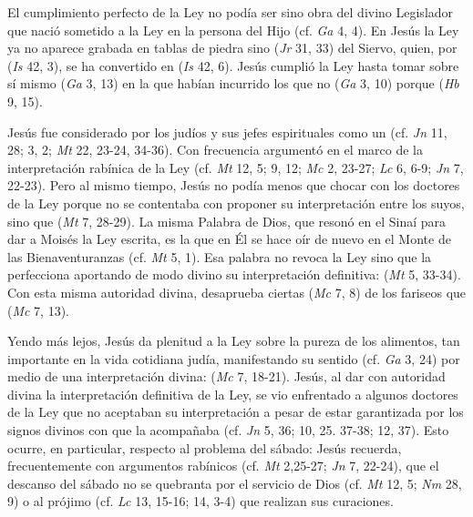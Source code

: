 	 El cumplimiento perfecto de la Ley no podía ser sino obra del divino Legislador que nació sometido a la Ley en la persona del Hijo (cf. \emph{Ga} 4, 4). En Jesús la Ley ya no aparece grabada en tablas de piedra sino  (\emph{Jr} 31, 33) del Siervo, quien, por  (\emph{Is} 42, 3), se ha convertido en  (\emph{Is} 42, 6). Jesús cumplió la Ley hasta tomar sobre sí mismo  (\emph{Ga} 3, 13) en la que habían incurrido los que no  (\emph{Ga} 3, 10) porque  (\emph{Hb} 9, 15).
	
	 Jesús fue considerado por los judíos y sus jefes espirituales como un  (cf. \emph{Jn} 11, 28; 3, 2; \emph{Mt} 22, 23-24, 34-36). Con frecuencia argumentó en el marco de la interpretación rabínica de la Ley (cf. \emph{Mt} 12, 5; 9, 12; \emph{Mc} 2, 23-27; \emph{Lc} 6, 6-9; \emph{Jn} 7, 22-23). Pero al mismo tiempo, Jesús no podía menos que chocar con los doctores de la Ley porque no se contentaba con proponer su interpretación entre los suyos, sino que  (\emph{Mt} 7, 28-29). La misma Palabra de Dios, que resonó en el Sinaí para dar a Moisés la Ley escrita, es la que en Él se hace oír de nuevo en el Monte de las Bienaventuranzas (cf. \emph{Mt} 5, 1). Esa palabra no revoca la Ley sino que la perfecciona aportando de modo divino su interpretación definitiva:  (\emph{Mt} 5, 33-34). Con esta misma autoridad divina, desaprueba ciertas  (\emph{Mc} 7, 8) de los fariseos que  (\emph{Mc} 7, 13).
	
	 Yendo más lejos, Jesús da plenitud a la Ley sobre la pureza de los alimentos, tan importante en la vida cotidiana judía, manifestando su sentido  (cf. \emph{Ga} 3, 24) por medio de una interpretación divina:  (\emph{Mc} 7, 18-21). Jesús, al dar con autoridad divina la interpretación definitiva de la Ley, se vio enfrentado a algunos doctores de la Ley que no aceptaban su interpretación a pesar de estar garantizada por los signos divinos con que la acompañaba (cf. \emph{Jn} 5, 36; 10, 25. 37-38; 12, 37). Esto ocurre, en particular, respecto al problema del sábado: Jesús recuerda, frecuentemente con argumentos rabínicos (cf. \emph{Mt} 2,25-27; \emph{Jn} 7, 22-24), que el descanso del sábado no se quebranta por el servicio de Dios (cf. \emph{Mt} 12, 5; \emph{Nm} 28, 9) o al prójimo (cf. \emph{Lc} 13, 15-16; 14, 3-4) que realizan sus curaciones.
	
